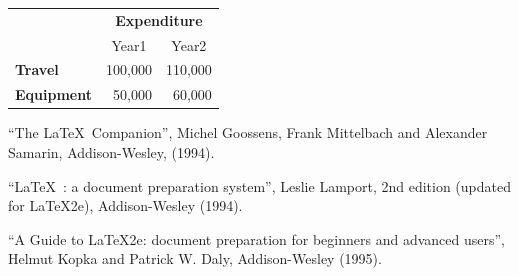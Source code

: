 \documentclass[12pt]{scrbook}
\begin{document}
\begin{tabular}{lrr}
 & \multicolumn{2}{c}{\bfseries Expenditure}\\
 & \multicolumn{1}{c}{Year1} & \multicolumn{1}{c}{Year2}\\
\bfseries Travel & 100,000 & 110,000\\
\bfseries Equipment & 50,000 & 60,000
\end{tabular}

\begin{thebibliography}{1}
 ``The \LaTeX\ Companion'', Michel Goossens, Frank Mittelbach and
Alexander Samarin, Addison-Wesley, (1994).

 ``\LaTeX\ : a document preparation system'', Leslie Lamport,
2nd edition (updated for \LaTeX2e), Addison-Wesley (1994).

 ``A Guide to \LaTeX2e: document preparation for beginners
and advanced users'', Helmut Kopka and Patrick W. Daly, Addison-Wesley (1995).

\end{thebibliography}
\end{document}
